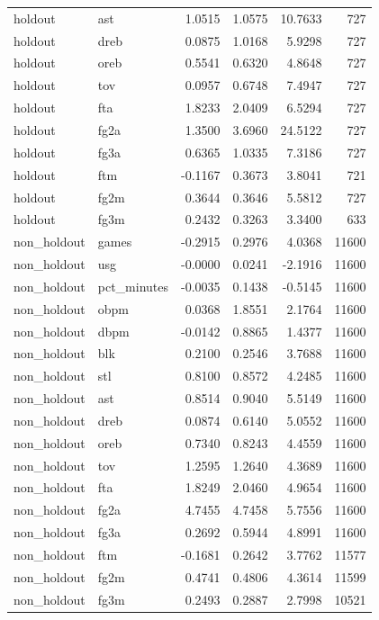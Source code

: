 \begin{table}
\begin{tabular}{llrrrr}
holdout & ast & 1.0515 & 1.0575 & 10.7633 & 727 \\
holdout & dreb & 0.0875 & 1.0168 & 5.9298 & 727 \\
holdout & oreb & 0.5541 & 0.6320 & 4.8648 & 727 \\
holdout & tov & 0.0957 & 0.6748 & 7.4947 & 727 \\
holdout & fta & 1.8233 & 2.0409 & 6.5294 & 727 \\
holdout & fg2a & 1.3500 & 3.6960 & 24.5122 & 727 \\
holdout & fg3a & 0.6365 & 1.0335 & 7.3186 & 727 \\
holdout & ftm & -0.1167 & 0.3673 & 3.8041 & 721 \\
holdout & fg2m & 0.3644 & 0.3646 & 5.5812 & 727 \\
holdout & fg3m & 0.2432 & 0.3263 & 3.3400 & 633 \\
non\_holdout & games & -0.2915 & 0.2976 & 4.0368 & 11600 \\
non\_holdout & usg & -0.0000 & 0.0241 & -2.1916 & 11600 \\
non\_holdout & pct\_minutes & -0.0035 & 0.1438 & -0.5145 & 11600 \\
non\_holdout & obpm & 0.0368 & 1.8551 & 2.1764 & 11600 \\
non\_holdout & dbpm & -0.0142 & 0.8865 & 1.4377 & 11600 \\
non\_holdout & blk & 0.2100 & 0.2546 & 3.7688 & 11600 \\
non\_holdout & stl & 0.8100 & 0.8572 & 4.2485 & 11600 \\
non\_holdout & ast & 0.8514 & 0.9040 & 5.5149 & 11600 \\
non\_holdout & dreb & 0.0874 & 0.6140 & 5.0552 & 11600 \\
non\_holdout & oreb & 0.7340 & 0.8243 & 4.4559 & 11600 \\
non\_holdout & tov & 1.2595 & 1.2640 & 4.3689 & 11600 \\
non\_holdout & fta & 1.8249 & 2.0460 & 4.9654 & 11600 \\
non\_holdout & fg2a & 4.7455 & 4.7458 & 5.7556 & 11600 \\
non\_holdout & fg3a & 0.2692 & 0.5944 & 4.8991 & 11600 \\
non\_holdout & ftm & -0.1681 & 0.2642 & 3.7762 & 11577 \\
non\_holdout & fg2m & 0.4741 & 0.4806 & 4.3614 & 11599 \\
non\_holdout & fg3m & 0.2493 & 0.2887 & 2.7998 & 10521 \\
\bottomrule
\end{tabular}
\end{table}
